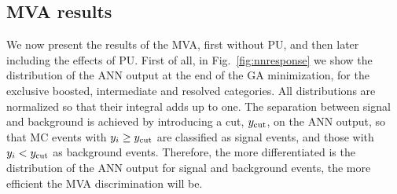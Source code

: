 \subsection{MVA results}
\label{sec:signalsignificance}

We now present the results of the MVA, first without PU, and then
later including the effects of PU.
%
First of all, in Fig.~\ref{fig:nnresponse} we show the distribution of
the ANN output at the end of the GA minimization, for the exclusive
boosted, intermediate and resolved categories.
%
All distributions are normalized so that their integral
  adds up to one.
%
The  separation between signal and background is achieved by introducing
a cut, $y_{\rm cut}$, on the ANN output, so that MC events with $y_i\ge
y_{\rm cut}$ are classified as signal events, and those with
 $y_i <
y_{\rm cut}$ as background events.
%
Therefore,
the more differentiated is the distribution of the ANN output
for signal and background events, the more efficient
the MVA discrimination will be.

